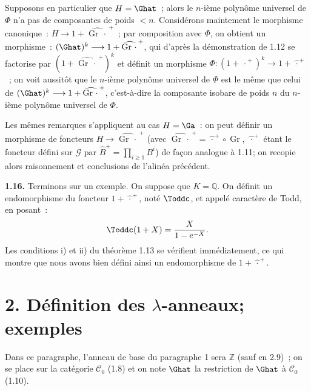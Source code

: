 Supposons en particulier que \(H=\Ghat\)~; alors le \(n\)-ième polynôme universel de \(\Phi\) n'a pas de composantes de poids \(<n\). Considérons maintement le morphisme canonique~: \(H\longrightarrow1+\widehat{\operatorname{Gr}\,\cdot\,}^{+}\)~; par composition avec \(\Phi\), on obtient un morphisme~: \((\Ghat)^k\longrightarrow1+\widehat{\operatorname{Gr}\,\cdot\,}^{+}\), qui d'après la démonstration de 1.12 se factorise par \((1+\widehat{\operatorname{Gr}\,\cdot\,}^{+})^k\) et définit un morphisme \(\Phi:(1+\widehat{\,\cdot\,}^{+})^k\longrightarrow1+\widehat{\,\cdot\,}^{+}\)~; on voit aussitôt que le \(n\)-ième polynôme universel de \(\Phi\) est le même que celui de \((\Ghat)^k\longrightarrow1+\widehat{\operatorname{Gr}\,\cdot\,}^{+}\), c'est-à-dire la composante isobare de poids \(n\) du \(n\)-ième polynôme universel de \(\Phi\).

Les mêmes remarques s'appliquent au cas \(H=\Ga\)~: on peut définir un morphisme de foncteurs \(H\longrightarrow\widehat{\operatorname{Gr}\,\cdot\,}^{+}\) (avec \(\widehat{\operatorname{Gr}\,\cdot\,}^{+}=\widehat{\,\cdot\,}^{+}\circ\operatorname{Gr}\), \(\widehat{\,\cdot\,}^{+}\) étant le foncteur défini sur \(\mathcal G\) par \(\widehat B^+=\prod_{i\geq1}B^i\)) de façon analogue à 1.11; on recopie alors raisonnement et conclusions de l'alinéa précédent.

\textbf{1.16.} Terminons sur un exemple. On suppose que \(K=\mathbb Q\). On définit un endomorphisme du foncteur \(1+\widehat{\,\cdot\,}^{+}\), noté \(\Toddc\), et appelé caractère de Todd, en posant~:
\[
  \Toddc(1+X)=\frac{X}{1-e^{-X}}.
\]
Les conditions i) et ii) du théorème 1.13 se vérifient immédiatement, ce qui montre que nous avons bien défini ainsi un endomorphisme de \(1+\widehat{\,\cdot\,}^{+}\).

\section*{2. Définition des \(\lambda\)-anneaux; exemples}

Dans ce paragraphe, l'anneau de base du paragraphe 1 sera \(\mathbb Z\) (sauf en 2.9)~; on se place sur la catégorie \(\mathcal C_0\) (1.8) et on note \(\Ghat\) la restriction de \(\Ghat\) à \(\mathcal C_0\) (1.10).

